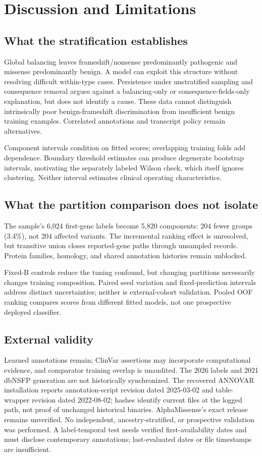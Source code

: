 \section{Discussion and Limitations}

\subsection{What the stratification establishes}
Global balancing leaves frameshift/nonsense predominantly pathogenic and missense predominantly benign. A model can exploit this structure without resolving difficult within-type cases. Persistence under unstratified sampling and consequence removal argues against a balancing-only or consequence-fields-only explanation, but does not identify a cause. These data cannot distinguish intrinsically poor benign-frameshift discrimination from insufficient benign training examples. Correlated annotations and transcript policy remain alternatives.

Component intervals condition on fitted scores; overlapping training folds add dependence. Boundary threshold estimates can produce degenerate bootstrap intervals, motivating the separately labeled Wilson check, which itself ignores clustering. Neither interval estimates clinical operating characteristics.

\subsection{What the partition comparison does not isolate}
The sample's 6,024 first-gene labels become 5,820 components: 204 fewer groups (3.4\%), not 204 affected variants. The incremental ranking effect is unresolved, but transitive union closes reported-gene paths through unsampled records. Protein families, homology, and shared annotation histories remain unblocked.

Fixed-B controls reduce the tuning confound, but changing partitions necessarily changes training composition. Paired seed variation and fixed-prediction intervals address distinct uncertainties; neither is external-cohort validation. Pooled OOF ranking compares scores from different fitted models, not one prospective deployed classifier.

\subsection{External validity}
Learned annotations remain; ClinVar assertions may incorporate computational evidence, and comparator training overlap is unaudited. The 2026 labels and 2021 dbNSFP generation are not historically synchronized. The recovered ANNOVAR installation reports annotation-script revision dated 2025-03-02 and table-wrapper revision dated 2022-08-02; hashes identify current files at the logged path, not proof of unchanged historical binaries. AlphaMissense's exact release remains unverified. No independent, ancestry-stratified, or prospective validation was performed. A label-temporal test needs verified first-availability dates and must disclose contemporary annotations; last-evaluated dates or file timestamps are insufficient.

